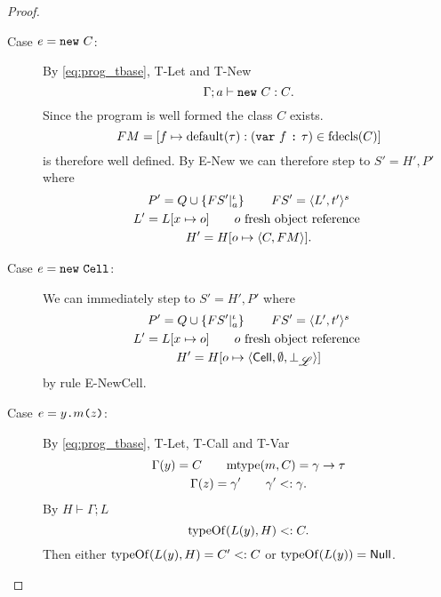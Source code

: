 \begin{proof}
\begin{description}
\begin{description}
        \item[Case $e = \mbox{\mdseries\texttt{new}~$C$}$:]
          By \eqref{eq:prog_tbase}, {\sc T-Let} and {\sc T-New}
          \begin{equation*}
            \mbox{$\Gamma;a\vdash\mbox{\mdseries\texttt{new}~$C$}:C$}.
          \end{equation*}
          Since the program is well formed the class $C$ exists. 
          \begin{equation*}
            FM = [f \mapsto \mbox{$\mathrm{default}$}(\tau): (\mbox{\mdseries\texttt{var}~$f$~\texttt{:}~$\tau$}) \in \mbox{$\mathrm{fdecls}$}(C)]
          \end{equation*}
          is therefore well defined. By {\sc E-New} we can therefore step to $S'
          = H', P'$ where
          \begin{equation*}
            \begin{gathered}
              P' = Q \cup \left\{FS'|_a^\iota \right\} \quad\quad FS' = \mbox{$\langle L',
              t' \rangle^s$} \\
              L' = L[x \mapsto o] \quad\quad o \text{ fresh object reference } \\
              H' = H[o \mapsto \mbox{$\langle C, FM \rangle$}].
            \end{gathered}
          \end{equation*}
          \contradiction

        \item[Case $e = \mbox{\mdseries\texttt{new}~\texttt{Cell}}$:]
          We can immediately step to $S' = H', P'$ where
          \begin{equation*}
            \begin{gathered}
              P' = Q \cup \left\{FS'|_a^\iota \right\} \quad\quad FS' = \mbox{$\langle L',
              t' \rangle^s$} \\
              L' = L[x \mapsto o] \quad\quad o \text{ fresh object reference } \\
              H' = H[o \mapsto \mbox{$\langle \mbox{$\mathsf{Cell}$}{}, \emptyset, \bot_{\mbox{$\mathscr{L}$}} \rangle$}]
            \end{gathered}
          \end{equation*}
          by rule {\sc E-NewCell}. \contradiction
      
        \item[Case $e = \mbox{\mdseries$y$\texttt{.}$m$\texttt{(}$z$\texttt{)}}$:]
          By \eqref{eq:prog_tbase}, {\sc T-Let}, {\sc T-Call} and {\sc T-Var}
          \begin{equation*}
            \begin{gathered}
              \Gamma(y) = C \quad\quad \mbox{$\mathrm{mtype}$}(m, C) = \gamma \to \tau \\
              \Gamma(z) = \gamma' \quad\quad \gamma' <: \gamma.
            \end{gathered}
          \end{equation*}
          By $H \vdash \Gamma;L$ 
          \begin{equation*}
            \mbox{$\mathrm{typeOf}$}(L(y), H) <: C.
          \end{equation*}
          Then either $\mbox{$\mathrm{typeOf}$}(L(y), H) = C' <: C$ or $\mbox{$\mathrm{typeOf}$}(L(y)) =
          \mbox{$\mathsf{Null}$}$.


\end{description}
\end{description}
\end{proof}
